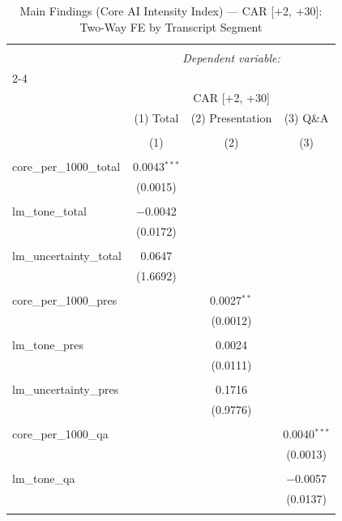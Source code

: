 
\begin{table}[!htbp] \centering 
  \caption{Main Findings (Core AI Intensity Index) — CAR [+2, +30]: Two-Way FE by Transcript Segment} 
  \label{} 
\begin{tabular}{@{\extracolsep{5pt}}lccc} 
\\[-1.8ex]\hline 
\hline \\[-1.8ex] 
 & \multicolumn{3}{c}{\textit{Dependent variable:}} \\ 
\cline{2-4} 
\\[-1.8ex] & \multicolumn{3}{c}{CAR [+2, +30]} \\ 
 & (1) Total & (2) Presentation & (3) Q\&A \\ 
\\[-1.8ex] & (1) & (2) & (3)\\ 
\hline \\[-1.8ex] 
 core\_per\_1000\_total & 0.0043$^{***}$ &  &  \\ 
  & (0.0015) &  &  \\ 
  & & & \\ 
 lm\_tone\_total & $-$0.0042 &  &  \\ 
  & (0.0172) &  &  \\ 
  & & & \\ 
 lm\_uncertainty\_total & 0.0647 &  &  \\ 
  & (1.6692) &  &  \\ 
  & & & \\ 
 core\_per\_1000\_pres &  & 0.0027$^{**}$ &  \\ 
  &  & (0.0012) &  \\ 
  & & & \\ 
 lm\_tone\_pres &  & 0.0024 &  \\ 
  &  & (0.0111) &  \\ 
  & & & \\ 
 lm\_uncertainty\_pres &  & 0.1716 &  \\ 
  &  & (0.9776) &  \\ 
  & & & \\ 
 core\_per\_1000\_qa &  &  & 0.0040$^{***}$ \\ 
  &  &  & (0.0013) \\ 
  & & & \\ 
 lm\_tone\_qa &  &  & $-$0.0057 \\ 
  &  &  & (0.0137) \\ 
  & & & \\ 

\end{tabular}
\end{table}
